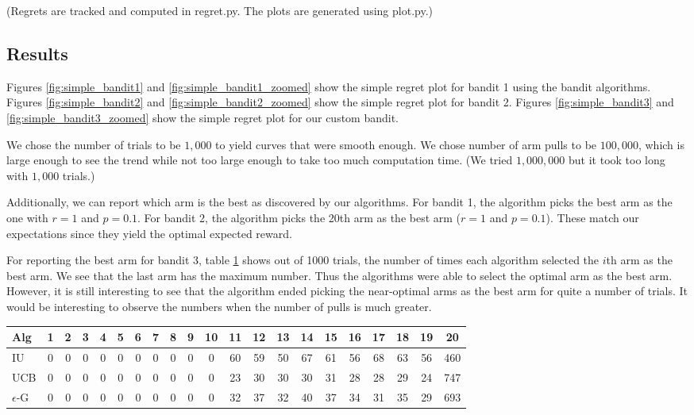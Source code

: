\documentclass[paper=a4, fontsize=11pt]{scrartcl}
\begin{document}
(Regrets are tracked and computed in regret.py. The plots are generated using plot.py.)

\subsection{Results}

Figures \ref{fig:simple_bandit1} and \ref{fig:simple_bandit1_zoomed} show the simple regret plot for bandit 1 using the bandit algorithms. Figures \ref{fig:simple_bandit2} and \ref{fig:simple_bandit2_zoomed} show the simple regret plot for bandit 2. Figures \ref{fig:simple_bandit3} and \ref{fig:simple_bandit3_zoomed} show the simple regret plot for our custom bandit.

We chose the number of trials to be $1,000$ to yield curves that were smooth enough. We chose number of arm pulls to be $100,000$, which is large enough to see the trend while not too large enough to take too much computation time. (We tried $1,000,000$ but it took too long with $1,000$ trials.)

Additionally, we can report which arm is the best as discovered by our algorithms. For bandit 1, the algorithm picks the best arm as the one with $r=1$ and $p = 0.1$. For bandit 2, the algorithm picks the 20th arm as the best arm ($r=1$ and $p = 0.1$). These match our expectations since they yield the optimal expected reward.

For reporting the best arm for bandit 3, table \ref{tab:arms} shows out of 1000 trials, the number of times each algorithm selected the $i$th arm as the best arm. We see that the last arm has the maximum number. Thus the algorithms were able to select the optimal arm as the best arm. However, it is still interesting to see that the algorithm ended picking the near-optimal arms as the best arm for quite a number of trials. It would be interesting to observe the numbers when the number of pulls is much greater.

\begin{table}
\begin{center}
 \label{tab:arms}
\begin{tabular}{ | l |c|c|c|c|c|c|c|c|c|c|c|c|c|c|c|c|c|c|c|c| }
  \hline
  Alg & 1 & 2 & 3 & 4 & 5 & 6 & 7 & 8 & 9 & 10 & 11 & 12 & 13 & 14 & 15 & 16 & 17 & 18 & 19 & 20\\ \hline
  IU & 0 & 0 & 0 & 0 & 0 & 0 & 0 & 0 & 0 & 0 & 60 & 59 & 50 & 67 & 61 & 56 & 68 & 63 & 56 & 460\\ \hline
  UCB & 0 & 0 & 0 & 0 & 0 & 0 & 0 & 0 & 0 & 0 & 23 & 30 & 30 & 30 & 31 & 28 & 28 & 29 & 24 & 747\\ \hline
  $\epsilon$-G & 0 & 0 & 0 & 0 & 0 & 0 & 0 & 0 & 0 & 0 & 32 & 37 & 32 & 40 & 37 & 34 & 31 & 35 & 29 & 693\\ \hline
\end{tabular}
\end{center}
\end{table}
\end{document}

